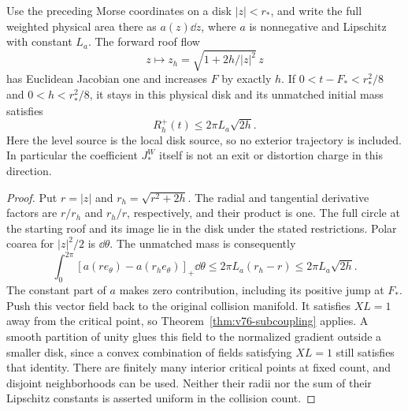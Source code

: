 \begin{proposition}
\label{prop:v76-morse-transport}
Use the preceding Morse coordinates on a disk $|z|<r_*$, and write
the full weighted physical area there as $a(z)\dd z$, where $a$
is nonnegative and Lipschitz with constant $L_a$. The forward roof
flow
\begin{equation}\label{eq:v76-morse-flow}
 z\longmapsto z_h=\sqrt{1+2h/|z|^2}\,z
\end{equation}
has Euclidean Jacobian one and increases $F$ by exactly $h$.
If $0<t-F_*<r_*^2/8$ and $0<h<r_*^2/8$, it stays in this
physical disk and its unmatched initial mass satisfies
\begin{equation}\label{eq:v76-morse-defect}
                  R_h^+(t)\le2\pi L_a\sqrt{2h}.
\end{equation}
Here the level source is the local disk source, so no exterior
trajectory is included. In particular the coefficient $J_*^W$
itself is not an exit or distortion charge in this direction.
\end{proposition}
\begin{proof}
Put $r=|z|$ and $r_h=\sqrt{r^2+2h}$. The radial and tangential
derivative factors are $r/r_h$ and $r_h/r$, respectively, and their
product is one. The full circle at the starting roof and its image
lie in the disk under the stated restrictions. Polar coarea for
$|z|^2/2$ is $\dd\theta$. The unmatched mass is consequently
\[
 \int_0^{2\pi}[a(r e_\theta)-a(r_h e_\theta)]_+\dd\theta
 \le2\pi L_a(r_h-r)\le2\pi L_a\sqrt{2h}.
\]
The constant part of $a$ makes zero contribution, including its
positive jump at $F_*$. Push this vector field back to the original
collision manifold. It satisfies $XL=1$ away from the critical point,
so Theorem~\ref{thm:v76-subcoupling} applies. A smooth partition of
unity glues this field to the normalized gradient outside a smaller
disk, since a convex combination of fields satisfying $XL=1$ still
satisfies that identity. There are finitely many interior critical
points at fixed count, and disjoint neighborhoods can be used.
Neither their radii nor the sum of their Lipschitz constants is
asserted uniform in the collision count.
\end{proof}
